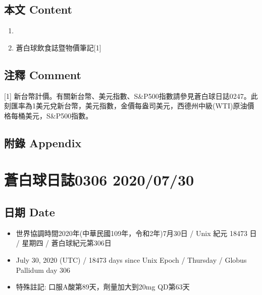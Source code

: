 \documentclass[a5paper, 11pt
]{book}
\providecommand{\tightlist}{%
  \setlength{\itemsep}{0pt}\setlength{\parskip}{0pt}}
\begin{document}
\hypertarget{ux672cux6587-content-58}{%
\subsection{本文 Content}\label{ux672cux6587-content-58}}

\begin{enumerate}
\def\labelenumi{\arabic{enumi}.}
\tightlist
\item
\item
  蒼白球飲食誌暨物價筆記{[}1{]}
\end{enumerate}

\hypertarget{ux6ce8ux91cb-comment-58}{%
\subsection{注釋 Comment}\label{ux6ce8ux91cb-comment-58}}

{[}1{]}
新台幣計價。有關新台幣、美元指數、S\&P500指數請參見蒼白球日誌0247。此刻匯率為1美元兌新台幣，美元指數，金價每盎司美元，西德州中級(WTI)原油價格每桶美元，S\&P500指數。

\hypertarget{ux9644ux9304-appendix-58}{%
\subsection{附錄 Appendix}\label{ux9644ux9304-appendix-58}}

\hypertarget{ux84bcux767dux7403ux65e5ux8a8c0306-20200730}{%
\section{蒼白球日誌0306
2020/07/30}\label{ux84bcux767dux7403ux65e5ux8a8c0306-20200730}}

\hypertarget{ux65e5ux671f-date-59}{%
\subsection{日期 Date}\label{ux65e5ux671f-date-59}}

\begin{itemize}
\tightlist
\item
  世界協調時間2020年(中華民國109年，令和2年)7月30日 / Unix 紀元 18473 日
  / 星期四 / 蒼白球紀元第306日
\item
  July 30, 2020 (UTC) / 18473 days since Unix Epoch / Thursday / Globus
  Pallidum day 306
\item
  特殊註記: 口服A酸第89天，劑量加大到20mg QD第63天
\end{itemize}
\end{document}
